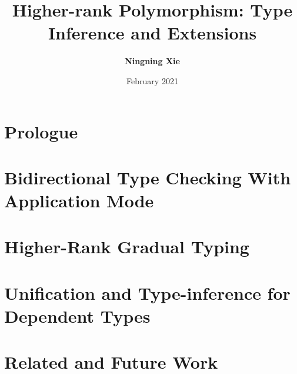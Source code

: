 

\title{Higher-rank Polymorphism: Type Inference and Extensions}
\author{\textbf{Ningning Xie}}
\date{February 2021}




\maketitle

\begin{abstract}
 
\end{abstract}


\frontmatter
\makedeclaration
\makeAck
\tableofcontents
\listoffigures
\listoftables

\mainmatter

\part{Prologue}





\part{Bidirectional Type Checking With Application Mode} \label{part:typeinference}



\part{Higher-Rank Gradual Typing}
\label{part:gradual}



\part{Unification and Type-inference for Dependent Types} \label{part:dependentTypes}






\part{Related and Future Work}

